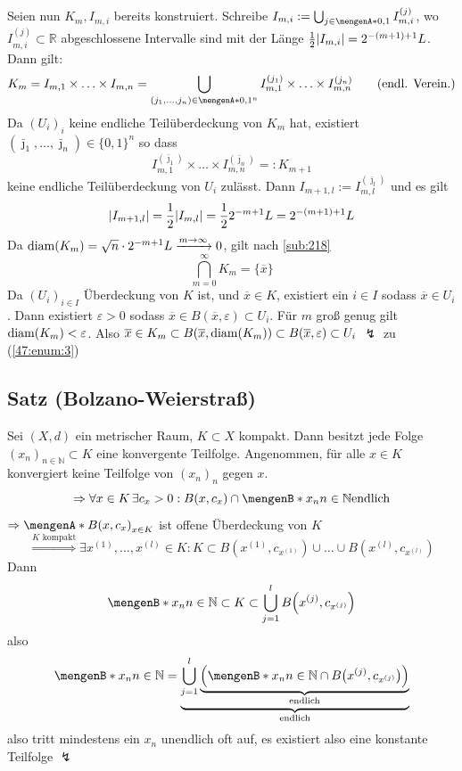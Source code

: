 \begin{description}
	Seien nun $K_m, I_{m,i}$ bereits konstruiert. Schreibe $I_{m,i} := \bigcup_{j \in \set{0,1} } I_{m,i}^{(j)}$, wo $I_{m,i}^{(j)} \subset \mathds{R}$ abgeschlossene
	Intervalle sind mit der Länge $\frac{1}{2} \abs*{I_{m,i}} = 2^{-(m+1)+1} L$. Dann gilt:
	\[
		K_m = I_{m,1} \times \ldots \times I_{m,n} = \bigcup_{(j_1, \ldots , j_n) \in \set{0,1}^n } I_{m,1}^{(j_1)} \times \ldots \times I_{m,n}^{(j_n)} \tag{endl. Verein.}
	\]
	Da $(U_i)_i$ keine endliche Teilüberdeckung von $K_m$ hat, existiert $(\bar \jmath_1, \ldots , \bar \jmath_n  ) \in \{ 0,1 \}^n$ so dass 
	\[
		I_{m,1}^{(\bar \jmath_1 )} \times \ldots \times I_{m,n}^{(\bar \jmath_n)} =: K_{m+1}
	\]
	keine endliche Teilüberdeckung von $U_i$ zulässt. Dann $I_{m+1, l} := I_{m,l}^{(\bar \jmath_l )}$ und es gilt
	\[
		\abs*{ I_{m+1,l}} = \frac{1}{2} \abs*{I_{m,l}} = \frac{1}{2} 2^{-m+1} L = 2^{-(m+1) +1} L  
	\]
	Da $\operatorname{diam} (K_m) = \sqrt{n} \cdot 2^{-m+1} L  \xrightarrow{m \to \infty} 0  $, gilt nach \ref{sub:218} 
	\[
		\bigcap_{m=0}^{\infty} K_m = \{ \overline{x} \} 
	\]
	Da $(U_i)_{i\in I}$ Überdeckung von $K$ ist, und $\overline{x} \in K$, existiert ein $i \in I$ sodass $\overline{x} \in U_i$. Dann existiert $\varepsilon >0$ sodass 
	$\overline{x} \in B(\overline{x}, \varepsilon ) \subset U_i$. Für $m$ groß genug gilt $\operatorname{diam} (K_m) < \varepsilon$.  Also 
	$\overline{x} \in K_m \subset B(\overline{x} , \operatorname{diam}(K_m)) \subset B(\overline{x}, \varepsilon) \subset U_i $ {\large$\lightning$} zu  (\ref{47:enum:3}) \bewende
\end{description}

\subsection{Satz (Bolzano-Weierstraß)} %
\label{sub:48}
Sei $(X,d)$ ein metrischer Raum, $K \subset X$ kompakt. Dann besitzt jede Folge $(x_n)_{n \in \mathds{N}} \subset K$ eine konvergente Teilfolge.
Angenommen, für alle $x \in K$ konvergiert keine Teilfolge von $(x_n)_{n}$ gegen $x$.\\
\[
	\Rightarrow \forall x \in K \, \exists c_x >0 : B(x, c_x) \cap \set[x_n]{n \in \mathds{N} } \text{endlich}  
\]
$\Rightarrow  \set{B(x, c_x)}_{x \in K} $ ist offene Überdeckung von $K$ 
\[
	\stackrel{K \text{ kompakt}}{\Longrightarrow} \exists x^{(1)}, \ldots , x^{(l)} \in K : K \subset B(x^{(1)}, c_{x^{(1)}}) \cup \ldots \cup B(x^{(l)}, c_{x^{(l)}})
\]
Dann
\[
	\set[x_n]{n \in \mathds{N} } \subset K \subset \bigcup_{j=1}^{l} B\Big(x^{(j)}, c_{x^{(j)}}\Big) 
\]
also 
\[
	\set[x_n]{n \in \mathds{N}} =  \underbrace{\bigcup_{j=1}^{l} \underbrace{\enbrace*{ \set[x_n]{n \in \mathds{N}} \cap B\big(x^{(j)}, c_{x^{(j)}}\big) }}_{\text{endlich}} }_{\text{endlich}}
\]
also tritt mindestens ein $x_n$ unendlich oft auf, es existiert also eine konstante Teilfolge {\large $\lightning$} \bewende

